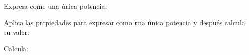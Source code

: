 \documentclass[addpoints,spanish, 12pt,a4paper]{exam}
\renewcommand*\half{.5}
\begin{document}
\begin{questions}

\question[1] Expresa como una única potencia:
\begin{multicols}{3}
\end{multicols}

\question[1\half] Aplica las propiedades para expresar como una única potencia y después calcula su valor:
\begin{multicols}{2}
\end{multicols}

\question[1\half] Calcula:


\end{questions}
\end{document}
